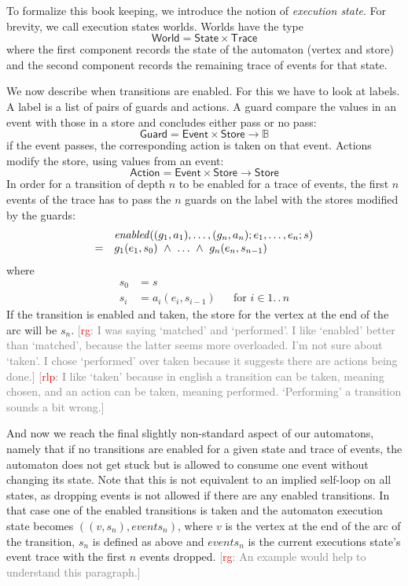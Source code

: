 \documentclass[preprint]{sigplanconf} %
\newcommand{\note}[2]{\textcolor{gray}{[\textcolor{red}{#1}: #2]}}
\newcommand{\rg}[1]{\note{rg}{#1}}
\newcommand{\rlp}[1]{\note{rlp}{#1}}
\newcommand{\B}{\ensuremath{\mathbb{B}}}
\newcommand{\set}[1]{\ensuremath{\mathsf{#1}}}
\newcommand{\functionfont}[1]{\mathit{#1}}
\newcommand{\enabled}{\functionfont{enabled}}
\theoremstyle{definition}
\theoremstyle{remark}
\begin{document}
To formalize this book keeping, we introduce the notion of
\emph{execution state}. For brevity, we call execution states worlds. Worlds have the type
\[
\set{World} = \set{State}\times\set{Trace}
\]
where the first component records the state of the automaton (vertex
and store) and the second component records the remaining trace of
events for that state.

We now describe when transitions are enabled. For this we have to look
at labels. A label is a list of pairs of guards and actions. A
guard compare the values in an event with those in a store and
concludes either pass or no pass:
\[
\set{Guard} = \set{Event}\times\set{Store}\to\B
\]
if the event passes, the corresponding action is taken on that event.
Actions modify the store, using values from an event:
\[
\set{Action} = \set{Event}\times\set{Store}\to\set{Store}
\]
In order for a transition of depth $n$ to be enabled for a trace of
events, the first $n$ events of the trace has to pass the $n$ guards
on the label with the stores modified by the guards:
\[
\begin{array}{c l}
& \enabled((g_1, a_1), \ldots, (g_n, a_n); e_1, \ldots, e_n; s) \\
 = &
g_1(e_1, s_0)\ \land\ \ldots\ \land\ g_n(e_n, s_{n-1}) 
\end{array}
\]
where
\begin{align}
  s_0 &=  s \\
  s_i &= a_i(e_i, s_{i-1}) &&\text{for $i\in1.\,.\,n$}
\end{align}
If the transition is enabled and taken, the store for the vertex at the end of the arc will be $s_n$.
\rg{I was saying `matched' and `performed'.
I like `enabled' better than `matched', because the latter seems more overloaded.
I'm not sure about `taken'.
I chose `performed' over taken because it suggests there are actions being done.}
\rlp{I like `taken' because in english a transition can be taken,
  meaning chosen, and an action can be taken, meaning
  performed. `Performing' a transition sounds a bit wrong.}

And now we reach the final slightly non-standard aspect of our
automatons, namely that if no transitions are enabled for a given
state and trace of events, the automaton does not get stuck but is
allowed to consume one event without changing its state. Note that
this is not equivalent to an implied self-loop on all states, as
dropping events is not allowed if there are any enabled
transitions. In that case one of the enabled transitions is taken and
the automaton execution state becomes $((v, s_n), \mathit{events}_n)$, where $v$ is the vertex at the
end of the arc of the transition, $s_n$ is defined as above and
$\mathit{events}_n$ is the current executions state's event trace with the first
$n$ events dropped.
\rg{An example would help to understand this paragraph.}
\end{document}
